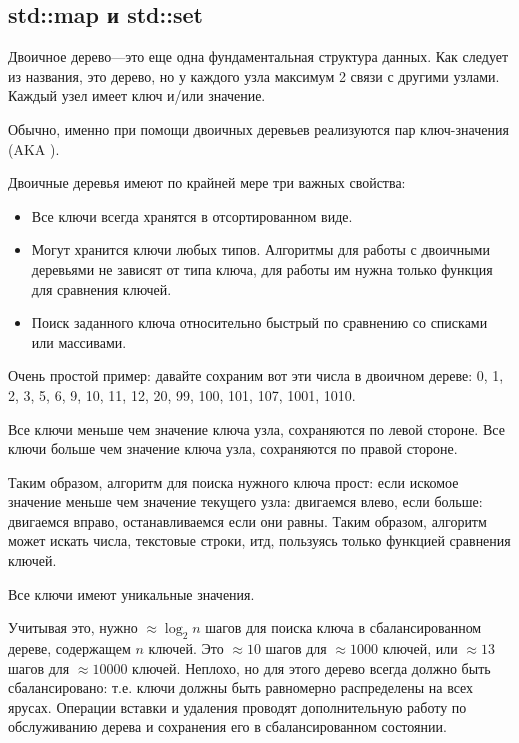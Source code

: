 \subsection{std::map и std::set}

Двоичное дерево---это еще одна фундаментальная структура данных.
Как следует из названия, это дерево, но у каждого узла максимум 2 связи с другими узлами.
Каждый узел имеет ключ и/или значение.

Обычно, именно при помощи двоичных деревьев реализуются  пар ключ-значения 
(\ac{AKA} ).

Двоичные деревья имеют по крайней мере три важных свойства:

\begin{itemize}
\item Все ключи всегда хранятся в отсортированном виде.
\item Могут хранится ключи любых типов.
Алгоритмы для работы с двоичными деревьями не зависят от типа ключа,
для работы им нужна только функция для сравнения ключей.
\item Поиск заданного ключа относительно быстрый по сравнению со списками или массивами.
\end{itemize}

Очень простой пример: давайте сохраним вот эти числа в двоичном дереве:
0, 1, 2, 3, 5, 6, 9, 10, 11, 12, 20, 99, 100, 101, 107, 1001, 1010.



Все ключи меньше чем значение ключа узла, сохраняются по левой стороне.
Все ключи больше чем значение ключа узла, сохраняются по правой стороне.

Таким образом, алгоритм для поиска нужного ключа прост: если искомое значение меньше чем значение текущего узла:
двигаемся влево, если больше: двигаемся вправо, останавливаемся если они равны.
Таким образом, алгоритм может искать числа, текстовые строки, итд, 
пользуясь только функцией сравнения ключей.

Все ключи имеют уникальные значения.

Учитывая это, нужно $\approx \log_{2} n$ шагов для поиска ключа 
в сбалансированном дереве, содержащем $n$ ключей.
Это $\approx 10$ шагов для $\approx 1000$ ключей, или $\approx 13$ 
шагов для $\approx 10000$ ключей.
Неплохо, но для этого дерево всегда должно быть сбалансировано: т.е. ключи должны быть равномерно распределены
на всех ярусах.
Операции вставки и удаления проводят дополнительную работу по обслуживанию дерева и сохранения его в сбалансированном
состоянии.

